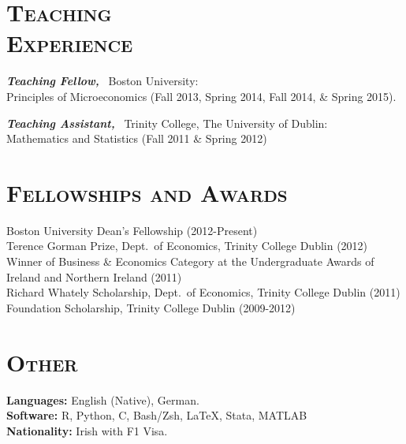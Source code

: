 \documentclass[margin, 10pt]{res}
\begin{document}
\begin{resume}
\section{\normalfont\textsc{Teaching \\Experience}}
\textbf{\textit{Teaching Fellow,}}~ Boston University:\\
Principles of Microeconomics (Fall 2013, Spring 2014, Fall 2014, \& Spring
2015).

\textbf{\textit{Teaching Assistant,}}~ Trinity College, The University of Dublin:\\
Mathematics and Statistics (Fall 2011 \& Spring 2012)

\section{\normalfont\textsc{Fellowships and Awards}}
Boston University Dean's Fellowship (2012-Present) \\
[0.5em]
Terence Gorman Prize, Dept.~of Economics, Trinity College Dublin (2012) \\
[0.5em]
Winner of Business \& Economics Category at the Undergraduate Awards of Ireland and
Northern Ireland (2011) \\
[0.5em]
Richard Whately Scholarship, Dept.~of Economics, Trinity College Dublin
(2011) \\
[0.5em]
Foundation Scholarship, Trinity College Dublin (2009-2012) \\

\section{\normalfont\textsc{Other}}
\textbf{Languages:} English (Native), German.\\
\textbf{Software:} R, Python, C, Bash/Zsh, \LaTeX, Stata, MATLAB \\
\textbf{Nationality:} Irish with F1 Visa.

\end{resume}
\end{document}
